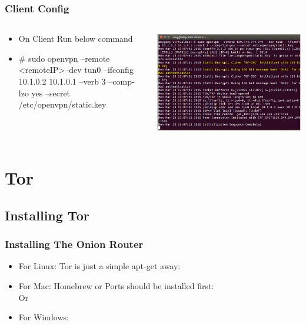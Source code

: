 \documentclass{beamer}
\begin{document}
\begin{frame}
\frametitle{Client Config}
\begin{columns}
    \begin{column}{0.48\textwidth}
        \begin{itemize}
	\item On Client Run below command\\
	\item \# sudo openvpn --remote \textless remoteIP\textgreater  --dev tun0 --ifconfig 10.1.0.2 10.1.0.1 --verb 3 --comp-lzo yes --secret /etc/openvpn/static.key
        \end{itemize}
    \end{column}
    \begin{column}{.5\textwidth}
        \includegraphics[width=.9\linewidth]{am2}
    \end{column}
\end{columns}
\end{frame}


\section{Tor}
\subsection{Installing Tor}
\begin{frame}
\frametitle{Installing The Onion Router}
\begin{itemize}
\item For Linux: Tor is just a simple apt-get away:\\
\pause
{\color{blue}{sudo apt-get install tor}}
\pause
\item For Mac: Homebrew or Ports should be installed first:\\
\pause{\color{blue}{brew install tor}} Or {\color{blue}{ports install tor}}
\pause
\item For Windows:
\pause
{\color{red}{You're on your own...}}

\end{itemize}
\end{frame}
\end{document}

